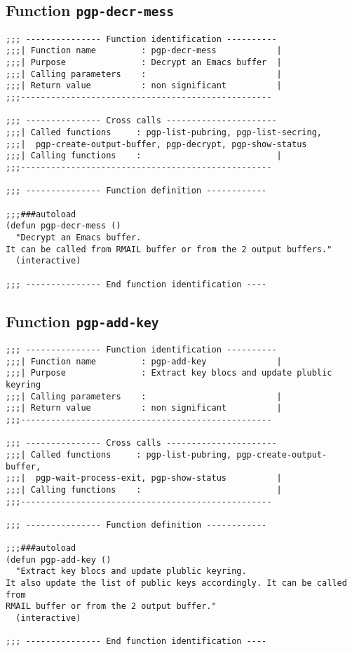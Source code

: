 \subsection{Function {\tt pgp-decr-mess}}
\leavevmode
\begin{verbatim}
;;; --------------- Function identification ----------
;;;| Function name         : pgp-decr-mess            |
;;;| Purpose               : Decrypt an Emacs buffer  |
;;;| Calling parameters    :                          |
;;;| Return value          : non significant          |
;;;--------------------------------------------------

;;; --------------- Cross calls ----------------------
;;;| Called functions     : pgp-list-pubring, pgp-list-secring,
;;;|  pgp-create-output-buffer, pgp-decrypt, pgp-show-status
;;;| Calling functions    :                           |
;;;--------------------------------------------------

;;; --------------- Function definition ------------

;;;###autoload
(defun pgp-decr-mess ()
  "Decrypt an Emacs buffer.
It can be called from RMAIL buffer or from the 2 output buffers."
  (interactive)

;;; --------------- End function identification ----
\end{verbatim}
\subsection{Function {\tt pgp-add-key}}
\leavevmode
\begin{verbatim}
;;; --------------- Function identification ----------
;;;| Function name         : pgp-add-key              |
;;;| Purpose               : Extract key blocs and update plublic keyring
;;;| Calling parameters    :                          |
;;;| Return value          : non significant          |
;;;--------------------------------------------------

;;; --------------- Cross calls ----------------------
;;;| Called functions     : pgp-list-pubring, pgp-create-output-buffer,
;;;|  pgp-wait-process-exit, pgp-show-status          |
;;;| Calling functions    :                           |
;;;--------------------------------------------------

;;; --------------- Function definition ------------

;;;###autoload
(defun pgp-add-key ()
  "Extract key blocs and update plublic keyring.
It also update the list of public keys accordingly. It can be called from
RMAIL buffer or from the 2 output buffer."
  (interactive)

;;; --------------- End function identification ----
\end{verbatim}
